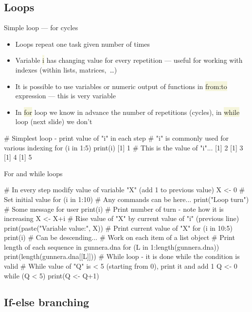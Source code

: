 \documentclass[compress, xelatex, 11pt, xcolor=svgnames, aspectratio=169, url={hyphens, lowtilde}]{beamer}
\renewcommand{\texttt}[1]{\colorbox{Beige}{{\ttfamily #1}}}
\begin{document}
\subsection{Loops}

\begin{frame}[fragile]{Simple loop --- for cycles}
	\begin{itemize}
		\item Loops repeat one task given number of times
		\item Variable \texttt{i} has changing value for every repetition --- useful for working with indexes (within lists, matrices,~\ldots)
		\item It is possible to use variables or numeric output of functions in \texttt{from:to} expression --- this is very variable
		\item In \texttt{for} loop we know in advance the number of repetitions (cycles), in \texttt{while} loop (next slide) we don't
	\end{itemize}
	\begin{spluscode}
    # Simplest loop - print value of "i" in each step
    # "i" is commonly used for various indexing
    for (i in 1:5) { print(i) }
    [1] 1 # This is the value of "i"...
    [1] 2
    [1] 3
    [1] 4
    [1] 5
	\end{spluscode}
\end{frame}

\begin{frame}[fragile]{For and while loops}
	\begin{spluscode}
    # In every step modify value of variable "X" (add 1 to previous value)
    X <- 0 # Set initial value
    for (i in 1:10) {
      # Any commands can be here...
      print("Loop turn") # Some message for user
      print(i) # Print number of turn - note how it is increasing
      X <- X+i # Rise value of "X" by current value of "i" (previous line)
      print(paste("Variable value:", X)) } # Print current value of "X"
    for (i in 10:5) { print(i) } # Can be descending...
    # Work on each item of a list object
    # Print length of each sequence in gunnera.dna
    for (L in 1:length(gunnera.dna)) {
      print(length(gunnera.dna[[L]])) }
    # While loop - it is done while the condition is valid
    # While value of "Q" is < 5 (starting from 0), print it and add 1
    Q <- 0
    while (Q < 5) { print(Q <- Q+1) }
	\end{spluscode}
\end{frame}

\subsection{If-else branching}
\end{document}
